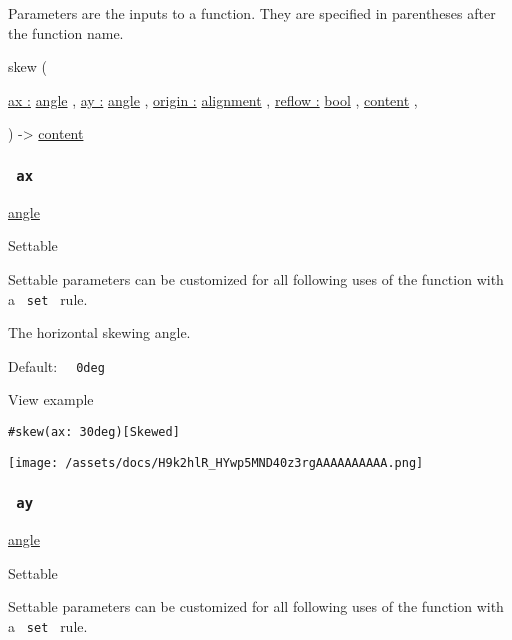 \label{parameters-tooltip}
Parameters are the inputs to a function. They are specified in
parentheses after the function name.

{ skew } (

{ \hyperref[parameters-ax]{ax :}
\href{/docs/reference/layout/angle/}{angle} , } {
\hyperref[parameters-ay]{ay :}
\href{/docs/reference/layout/angle/}{angle} , } {
\hyperref[parameters-origin]{origin :}
\href{/docs/reference/layout/alignment/}{alignment} , } {
\hyperref[parameters-reflow]{reflow :}
\href{/docs/reference/foundations/bool/}{bool} , } {
\href{/docs/reference/foundations/content/}{content} , }

) -\textgreater{} \href{/docs/reference/foundations/content/}{content}

\subsubsection{\texorpdfstring{\texttt{\ ax\ }}{ ax }}\label{parameters-ax}

\href{/docs/reference/layout/angle/}{angle}

{{ Settable }}

\label{parameters-ax-settable-tooltip}
Settable parameters can be customized for all following uses of the
function with a \texttt{\ set\ } rule.

The horizontal skewing angle.

Default: \texttt{\ }{\texttt{\ 0deg\ }}\texttt{\ }


View example

\begin{verbatim}
#skew(ax: 30deg)[Skewed]
\end{verbatim}

\texttt{[image: /assets/docs/H9k2hlR\_HYwp5MND40z3rgAAAAAAAAAA.png]}

\subsubsection{\texorpdfstring{\texttt{\ ay\ }}{ ay }}\label{parameters-ay}

\href{/docs/reference/layout/angle/}{angle}

{{ Settable }}

\label{parameters-ay-settable-tooltip}
Settable parameters can be customized for all following uses of the
function with a \texttt{\ set\ } rule.

